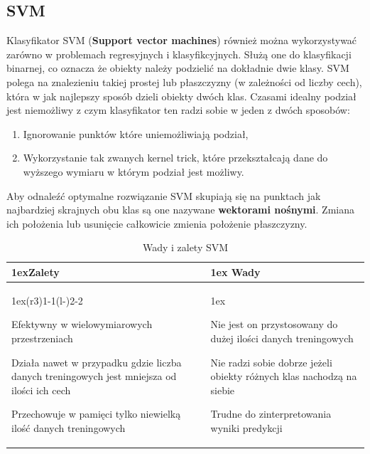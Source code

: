 \subsection{SVM}

Klasyfikator SVM (\textbf{Support vector machines}) również można wykorzystywać zarówno 
w problemach regresyjnych i klasyfikcyjnych. Służą one do klasyfikacji binarnej, co 
oznacza że obiekty należy podzielić na dokładnie dwie klasy. SVM polega na znalezieniu
takiej prostej lub płaszczyzny (w zależności od liczby cech), która w jak najlepszy sposób
dzieli obiekty dwóch klas. Czasami idealny podział jest niemożliwy z czym klasyfikator 
ten radzi sobie w jeden z dwóch sposobów:
\begin{enumerate}
    \item Ignorowanie punktów które uniemożliwiają podział,
    \item Wykorzystanie tak zwanych kernel trick, które przekształcają dane do wyższego 
    wymiaru w którym podział jest możliwy.
\end{enumerate}
Aby odnaleźć optymalne rozwiązanie SVM skupiają się na punktach jak najbardziej skrajnych
obu klas są one nazywane \textbf{wektorami nośnymi}. Zmiana ich położenia lub usunięcie
całkowicie zmienia położenie płaszczyzny.

\begin{table}[h]
    \begin{tabularx}{\linewidth}{>{\parskip1ex}X@{\kern4\tabcolsep}>{\parskip1ex}X}
    \toprule
    \hfil\bfseries Zalety
    &
    \hfil\bfseries Wady
    \\\cmidrule(r{3\tabcolsep}){1-1}\cmidrule(l{-\tabcolsep}){2-2}
    
    Efektywny w wielowymiarowych przestrzeniach\par
    Działa nawet w przypadku gdzie liczba danych treningowych jest mniejsza od
    ilości ich cech\par
    Przechowuje w pamięci tylko niewielką ilość danych treningowych\par
    
    &
    
    Nie jest on przystosowany do dużej ilości danych treningowych\par
    Nie radzi sobie dobrze jeżeli obiekty różnych klas nachodzą na siebie\par
    Trudne do zinterpretowania wyniki predykcji
    
    \\\bottomrule
    \end{tabularx}
    \caption{Wady i zalety SVM}
\end{table}

